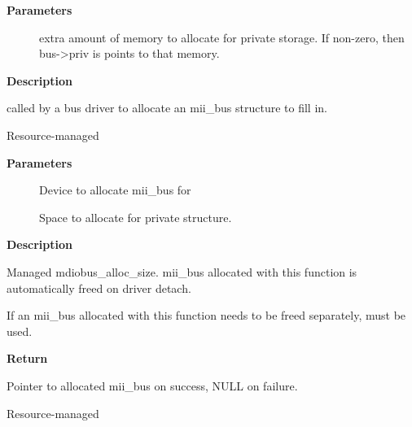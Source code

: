 \documentclass[a4paper,8pt,english]{sphinxmanual}
\begin{document}
\textbf{Parameters}
\begin{description}
\item[{}] \leavevmode
extra amount of memory to allocate for private storage.
If non-zero, then bus-\textgreater{}priv is points to that memory.

\end{description}

\textbf{Description}

called by a bus driver to allocate an mii\_bus
structure to fill in.

\begin{fulllineitems}
\label{networking/kapi:c.devm_mdiobus_alloc_size}
Resource-managed {\hyperref[networking/kapi:c.mdiobus_alloc_size]{\emph{}}}

\end{fulllineitems}


\textbf{Parameters}
\begin{description}
\item[{}] \leavevmode
Device to allocate mii\_bus for

\item[{}] \leavevmode
Space to allocate for private structure.

\end{description}

\textbf{Description}

Managed mdiobus\_alloc\_size. mii\_bus allocated with this function is
automatically freed on driver detach.

If an mii\_bus allocated with this function needs to be freed separately,
{\hyperref[networking/kapi:c.devm_mdiobus_free]{\emph{}}} must be used.

\textbf{Return}

Pointer to allocated mii\_bus on success, NULL on failure.

\begin{fulllineitems}
\label{networking/kapi:c.devm_mdiobus_free}
Resource-managed {\hyperref[networking/kapi:c.mdiobus_free]{\emph{}}}

\end{fulllineitems}
\end{document}
